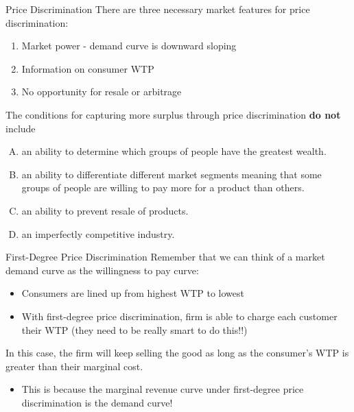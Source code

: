 \documentclass[11pt,t]{beamer}
\begin{document}
\begin{frame}{Price Discrimination}
  There are three necessary market features for price discrimination:

  \begin{enumerate}
    \item Market power - demand curve is downward sloping
    
    \item Information on consumer WTP
    
    \item No opportunity for resale or arbitrage
  \end{enumerate}
\end{frame}

\begin{frame}{}
  The conditions for capturing more surplus through price discrimination \textbf{do not} include

  \begin{enumerate}[A)]
    \item an ability to determine which groups of people have the greatest wealth.
    \item an ability to differentiate different market segments meaning that some groups of people are willing to pay more for a product than others.
    \item an ability to prevent resale of products.
    \item an imperfectly competitive industry.
  \end{enumerate}
\end{frame}

\begin{frame}{First-Degree Price Discrimination}
  Remember that we can think of a market demand curve as the willingness to pay curve:

  \begin{itemize}
    \item Consumers are lined up from highest WTP to lowest
    
    \item With first-degree price discrimination, firm is able to charge each customer their WTP (they need to be really smart to do this!!)    
  \end{itemize}

  \bigskip\pause
  In this case, the firm will keep selling the good as long as the consumer's WTP is greater than their marginal cost.
  \begin{itemize}
    \item This is because the marginal revenue curve under first-degree price discrimination is the demand curve!
  \end{itemize}
\end{frame}
\end{document}
